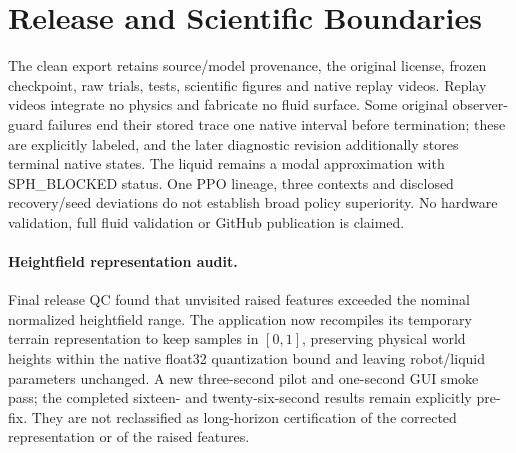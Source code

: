 \section{Release and Scientific Boundaries}
The clean export retains source/model provenance, the original license, frozen checkpoint, raw trials, tests, scientific figures and native replay videos. Replay videos integrate no physics and fabricate no fluid surface. Some original observer-guard failures end their stored trace one native interval before termination; these are explicitly labeled, and the later diagnostic revision additionally stores terminal native states. The liquid remains a modal approximation with SPH\_BLOCKED status. One PPO lineage, three contexts and disclosed recovery/seed deviations do not establish broad policy superiority. No hardware validation, full fluid validation or GitHub publication is claimed.

\paragraph{Heightfield representation audit.} Final release QC found that unvisited raised features exceeded the nominal normalized heightfield range. The application now recompiles its temporary terrain representation to keep samples in $[0,1]$, preserving physical world heights within the native float32 quantization bound and leaving robot/liquid parameters unchanged. A new three-second pilot and one-second GUI smoke pass; the completed sixteen- and twenty-six-second results remain explicitly pre-fix. They are not reclassified as long-horizon certification of the corrected representation or of the raised features.
